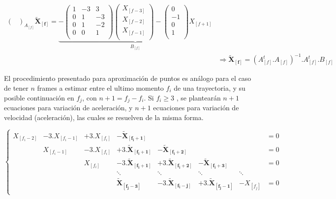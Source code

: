 \begin{equation}
\begin{split}
{\begin{pmatrix}
\end{pmatrix}
}_{A_{[f]}}\boldsymbol{\tilde{X}_{[f]}} = \underbrace{- \begin{pmatrix}
1 &-3 &3\\
0 &1 &-3\\
0 &1 &-2\\
0 &0 &1\\
\end{pmatrix}
\begin{pmatrix}
X_{[f-3]}\\
X_{[f-2]}\\
X_{[f-1]}\\
\end{pmatrix} - \begin{pmatrix}
0\\
-1\\
0\\
1\\
\end{pmatrix}
X_{[f+1]}}_{B_{[f]}} \\
&\Rightarrow \boldsymbol{\tilde{X}_{[f]}} = \left( A_{[f]}^{t}.A_{[f]}\right)^{-1}.A_{[f]}^{t}.B_{[f]}
\end{split}
\label{matrices_estimacion_01}
\end{equation}

El procedimiento presentado para aproximación de puntos es análogo para el caso de tener $n$ frames a estimar entre el ultimo momento $f_{i}$ de una trayectoria, y su posible continuación en $f_{j}$, con $n+1=f_{j}-f_{i}$. Si $f_{i} \geq 3$ , se plantearán $n+1$ ecuaciones para variación de aceleración, y $n+1$ ecuaciones para variación de velocidad (aceleración), las cuales se resuelven de la misma forma. 

\begin{equation}
\left\{
\begin{matrix}
X_{[f_{i}-2]} &-3.X_{[f_{i}-1]} &+3.X_{[f_{i}]} &-\boldsymbol{\tilde{X}_{[f_{i}+1]}} & & & &=0 \\
& X_{[f_{i}-1]} &-3.X_{[f_{i}]} &+3.\boldsymbol{\tilde{X}_{[f_{i}+1]}} &-\boldsymbol{\tilde{X}_{[f_{i}+2]}} & & &=0 \\
& & X_{[f_{i}]} &-3.\boldsymbol{\tilde{X}_{[f_{i}+1]}} &+3.\boldsymbol{\tilde{X}_{[f_{i}+2]}} &-\boldsymbol{\tilde{X}_{[f_{i}+3]}}& &=0 \\
& & & \ddots & \ddots & \ddots & \ddots & \\
& & & \boldsymbol{\tilde{X}_{[f_{j}-3]}} &-3.\boldsymbol{\tilde{X}_{[f_{i}-j]}} &+3.\boldsymbol{\tilde{X}_{[f_{j}-1]}} &-X_{[f_{j}]} &=0 \\
\end{matrix}
\right.
\label{ecuaciones_estimacion_n}
\end{equation}

